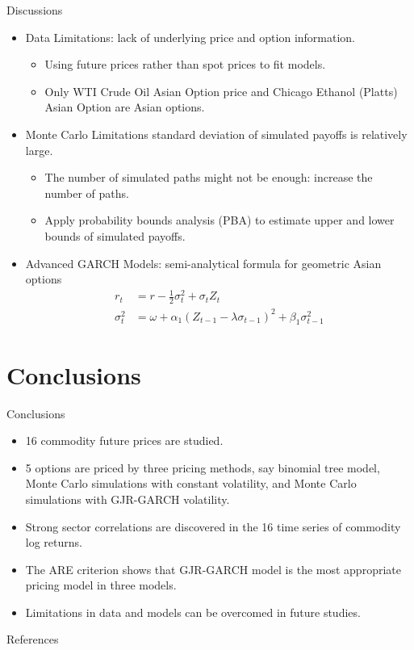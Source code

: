 \documentclass[8pt]{beamer}
\numberwithin{equation}{section}
\begin{document}
\begin{frame}{Discussions}
\begin{itemize}
	\item Data Limitations: lack of underlying price and option information. 
	\begin{itemize}
		\item Using future prices rather than spot prices to fit models. 
		\item Only WTI Crude Oil Asian Option price and Chicago Ethanol (Platts) Asian Option are Asian options.
	\end{itemize}

	\item Monte Carlo Limitations standard deviation of simulated payoffs is relatively large.
	\begin{itemize}
		\item The number of simulated paths might not be enough: increase the number of paths.
		\item Apply probability bounds analysis (PBA) to estimate upper and lower bounds of simulated payoffs.
	\end{itemize}
	\item Advanced GARCH Models\cite{lorenzo2011pricing}: semi-analytical formula for geometric Asian options
	\begin{equation}
	\begin{aligned}
	r_t &= r - \frac 12 \sigma_t^2 + \sigma_t Z_t
	\\
	\sigma_t^2 &= \omega + \alpha_1 (Z_{t-1} -\lambda \sigma_{t-1})^2+\beta_1 \sigma_{t-1}^2
	\end{aligned}
	\end{equation}
\end{itemize}
\end{frame}

\section{Conclusions}

\frame{\tableofcontents[currentsection]}

\begin{frame}{Conclusions}

\begin{itemize}
	\item 16 commodity future prices are studied.
	\item 5 options are priced by three pricing methods, say binomial tree model, Monte Carlo simulations with constant volatility, and Monte Carlo simulations with GJR-GARCH volatility.
	\item Strong sector correlations are discovered in the 16 time series of commodity log returns.
	\item The ARE criterion shows that GJR-GARCH model is the most appropriate pricing model in three models.
	\item Limitations in data and models can be overcomed in future studies.
\end{itemize}

\end{frame}

\begin{frame}[allowframebreaks]{References}


\end{frame}
\end{document}
